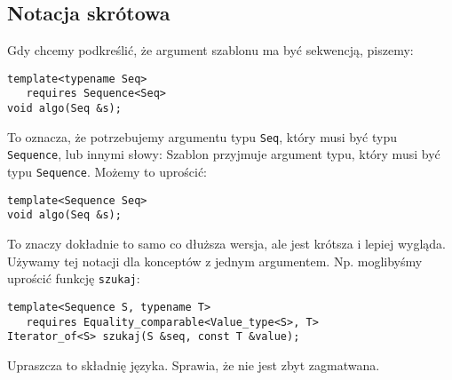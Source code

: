 \documentclass[11pt, a4paper]{article}
\begin{document}
\lstset{language=C++}

\subsection{Notacja skrótowa}
Gdy chcemy podkreślić, że argument szablonu ma być sekwencją, piszemy:

\begin{lstlisting}[frame=single]
template<typename Seq>
   requires Sequence<Seq>
void algo(Seq &s);

\end{lstlisting}

To oznacza, że potrzebujemy argumentu typu \verb#Seq#, który musi być typu \verb#Sequence#, lub innymi słowy: Szablon przyjmuje argument typu, który musi być typu \verb#Sequence#. Możemy to uprościć:

\begin{lstlisting}[frame=single]
template<Sequence Seq>
void algo(Seq &s);

\end{lstlisting}

To znaczy dokładnie to samo co dłuższa wersja, ale jest krótsza i lepiej wygląda. Używamy tej notacji dla konceptów z jednym argumentem. Np. moglibyśmy uprościć funkcję \verb#szukaj#: \newline

\begin{lstlisting}[frame=single]
template<Sequence S, typename T>
   requires Equality_comparable<Value_type<S>, T>
Iterator_of<S> szukaj(S &seq, const T &value);
\end{lstlisting}

Upraszcza to składnię języka. Sprawia, że nie jest zbyt zagmatwana.
\end{document}
